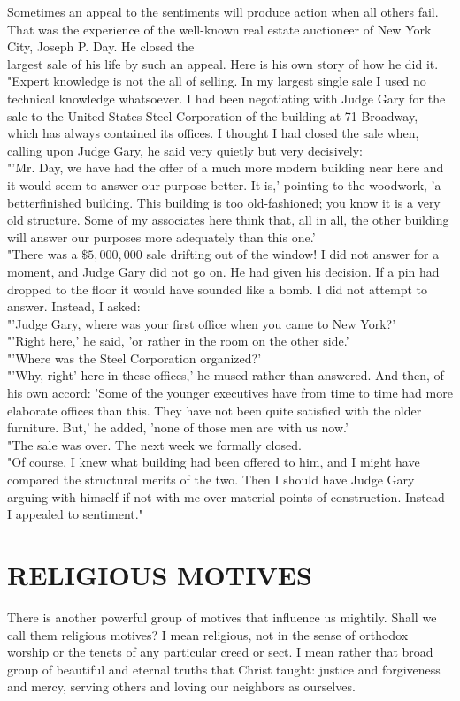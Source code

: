 \documentclass[10pt]{article}
\begin{document}
Sometimes an appeal to the sentiments will produce action when all others fail. That was the experience of the well-known real estate auctioneer of New York City, Joseph P. Day. He closed the\\
largest sale of his life by such an appeal. Here is his own story of how he did it.\\
"Expert knowledge is not the all of selling. In my largest single sale I used no technical knowledge whatsoever. I had been negotiating with Judge Gary for the sale to the United States Steel Corporation of the building at 71 Broadway, which has always contained its offices. I thought I had closed the sale when, calling upon Judge Gary, he said very quietly but very decisively:\\
"'Mr. Day, we have had the offer of a much more modern building near here and it would seem to answer our purpose better. It is,' pointing to the woodwork, 'a betterfinished building. This building is too old-fashioned; you know it is a very old structure. Some of my associates here think that, all in all, the other building will answer our purposes more adequately than this one.'\\
"There was a $\$ 5,000,000$ sale drifting out of the window! I did not answer for a moment, and Judge Gary did not go on. He had given his decision. If a pin had dropped to the floor it would have sounded like a bomb. I did not attempt to answer. Instead, I asked:\\
"'Judge Gary, where was your first office when you came to New York?'\\
"'Right here,' he said, 'or rather in the room on the other side.'\\
"'Where was the Steel Corporation organized?'\\
"'Why, right' here in these offices,' he mused rather than answered. And then, of his own accord: 'Some of the younger executives have from time to time had more elaborate offices than this. They have not been quite satisfied with the older furniture. But,' he added, 'none of those men are with us now.'\\
"The sale was over. The next week we formally closed.\\
"Of course, I knew what building had been offered to him, and I might have compared the structural merits of the two. Then I should have Judge Gary arguing-with himself if not with me-over material points of construction. Instead I appealed to sentiment."

\section*{RELIGIOUS MOTIVES}
There is another powerful group of motives that influence us mightily. Shall we call them religious motives? I mean religious, not in the sense of orthodox worship or the tenets of any particular creed or sect. I mean rather that broad group of beautiful and eternal truths that Christ taught: justice and forgiveness and mercy, serving others and loving our neighbors as ourselves.
\end{document}
